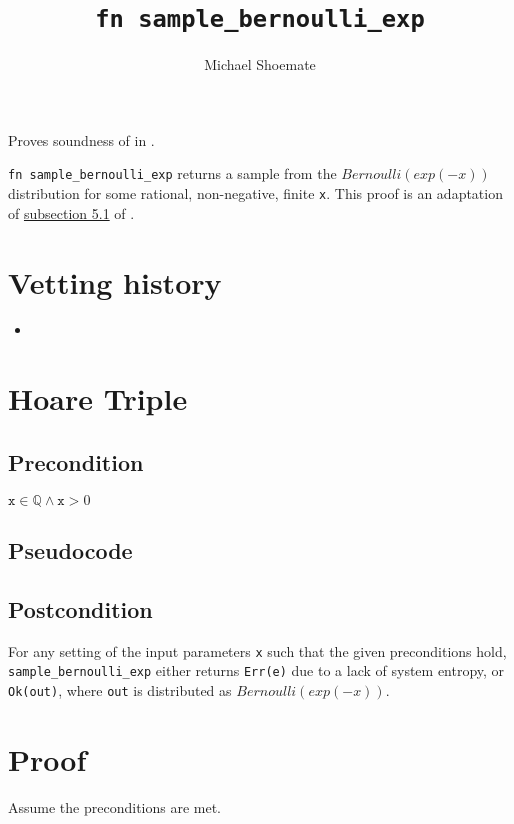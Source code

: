 \documentclass{article}
\title{\texttt{fn sample\_bernoulli\_exp}}
\author{Michael Shoemate}
\begin{document}
\maketitle

\contrib
Proves soundness of  in .

\texttt{fn sample\_bernoulli\_exp} returns a sample from the $Bernoulli(exp(-x))$ distribution for some rational, non-negative, finite \texttt{x}.
This proof is an adaptation of \href{https://arxiv.org/pdf/2004.00010.pdf#subsection.5.1}{subsection 5.1} of \cite{CKS20}.

\section*{Vetting history}
\begin{itemize}
    \item {}
\end{itemize}

\section{Hoare Triple}
\subsection*{Precondition}
$\texttt{x} \in \mathbb{Q} \land \texttt{x} > 0$

\subsection*{Pseudocode}


\subsection*{Postcondition}
\label{postcondition}
For any setting of the input parameters \texttt{x} such that the given preconditions hold, \\
\texttt{sample\_bernoulli\_exp} either returns \texttt{Err(e)} due to a lack of system entropy,
or \texttt{Ok(out)}, where \texttt{out} is distributed as $Bernoulli(exp(-x))$.

\section{Proof}
Assume the preconditions are met.
\end{document}

